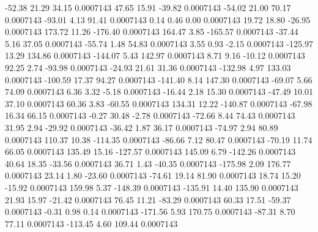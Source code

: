       -52.38       21.29       34.15     0.0007143
       47.65       15.91      -39.82     0.0007143
      -54.02       21.00       70.17     0.0007143
      -93.01        4.13       91.41     0.0007143
        0.14        0.46        0.00     0.0007143
       19.72       18.80      -26.95     0.0007143
      173.72       11.26     -176.40     0.0007143
      164.47        3.85     -165.57     0.0007143
      -37.44        5.16       37.05     0.0007143
      -55.74        1.48       54.83     0.0007143
        3.55        0.93       -2.15     0.0007143
     -125.97       13.29      134.86     0.0007143
     -144.07        5.43      142.97     0.0007143
        8.71        9.16      -10.12     0.0007143
       92.25        2.74      -93.98     0.0007143
      -24.93       21.61       31.36     0.0007143
     -132.98        4.97      133.03     0.0007143
     -100.59       17.37       94.27     0.0007143
     -141.40        8.14      147.30     0.0007143
      -69.07        5.66       74.09     0.0007143
        6.36        3.32       -5.18     0.0007143
      -16.44        2.18       15.30     0.0007143
      -47.49       10.01       37.10     0.0007143
       60.36        3.83      -60.55     0.0007143
      134.31       12.22     -140.87     0.0007143
      -67.98       16.34       66.15     0.0007143
       -0.27       30.48       -2.78     0.0007143
      -72.66        8.44       74.43     0.0007143
       31.95        2.94      -29.92     0.0007143
      -36.42        1.87       36.17     0.0007143
      -74.97        2.94       80.89     0.0007143
      110.37       10.38     -114.35     0.0007143
      -86.66        7.12       80.47     0.0007143
      -70.19       11.74       66.05     0.0007143
      135.49       15.16     -127.57     0.0007143
      145.09        6.79     -142.26     0.0007143
       40.64       18.35      -33.56     0.0007143
       36.71        1.43      -40.35     0.0007143
     -175.98        2.09      176.77     0.0007143
       23.14        1.80      -23.60     0.0007143
      -74.61       19.14       81.90     0.0007143
       18.74       15.20      -15.92     0.0007143
      159.98        5.37     -148.39     0.0007143
     -135.91       14.40      135.90     0.0007143
       21.93       15.97      -21.42     0.0007143
       76.45       11.21      -83.29     0.0007143
       60.33       17.51      -59.37     0.0007143
       -0.31        0.98        0.14     0.0007143
     -171.56        5.93      170.75     0.0007143
      -87.31        8.70       77.11     0.0007143
     -113.45        4.60      109.44     0.0007143
